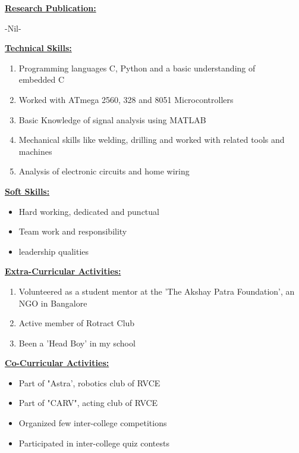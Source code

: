 \documentclass[10pt]{article}
\begin{document}
	\hfill 
	
	\underline{\textbf{\Large{Research Publication:}}}
	\begin{enumerate}
		-Nil-
	\end{enumerate}

	\hfill
	
	\underline{\textbf{\Large{Technical Skills:}}}
	\begin{enumerate}
		\item{Programming languages C, Python and a basic understanding of \\embedded C}
		\item{Worked with ATmega 2560, 328 and 8051 Microcontrollers}
		\item {Basic Knowledge of signal analysis using MATLAB}
		\item{Mechanical skills like welding, drilling and worked with related tools and machines}
		\item{Analysis of electronic circuits and home wiring}
	\end{enumerate}
	
	\vspace{3cm}
	\hfill 
	\hfill
	
	\underline{\textbf{\Large{Soft Skills:}}}
	\begin{itemize}
		\item{Hard working, dedicated and punctual}
		\item{Team work and responsibility}
		\item{leadership qualities} 
	\end{itemize}
	
	\hfill
	
	\underline{\textbf{\Large{Extra-Curricular Activities:}}}
	\begin{enumerate}
		\item{Volunteered as a student mentor at the 'The Akshay Patra Foundation', an NGO in Bangalore}
		\item {Active member of Rotract Club}
		\item{Been a 'Head Boy' in my school}	
	\end{enumerate}

	\hfill
	
	\underline{\textbf{\Large{Co-Curricular Activities:}}}
	\begin{itemize}
		\item{Part of "Astra', robotics club of RVCE}
		\item{Part of "CARV", acting club of RVCE}
		\item{Organized few inter-college competitions}
		\item{Participated in inter-college quiz contests}\\		
	\end{itemize}
	
\end{document}

